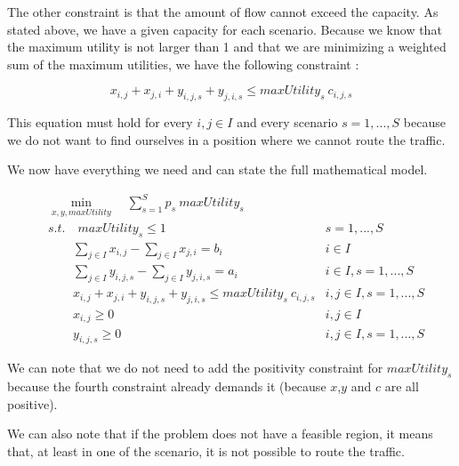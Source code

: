  The other constraint is that the amount of flow cannot exceed the capacity. As stated above, we have a given capacity for each scenario. Because we know that the maximum utility is not larger than 1 and that we are minimizing a weighted sum of the maximum utilities, we have the following constraint :
 
 $$x_{i,j}+x_{j,i}+y_{i,j,s}+y_{j,i,s} \leq maxUtility_s \: c_{i,j,s}$$
 
 This equation must hold for every $i,j \in I$ and every scenario $s=1,...,S$ because we do not want to find ourselves in a position where we cannot route the traffic.
 
 We now have everything we need and can state the full mathematical model.
 
 \begin{align*}
 &\min_{x,y,maxUtility} \quad \sum_{s=1}^S p_s \: maxUtility_s &\\
 &s.t. \quad maxUtility_s \leq 1 &s=1,...,S\\
 &\quad\quad \sum_{j\in I}x_{i,j} - \sum_{j\in I}x_{j,i} = b_i &i\in I\\
 &\quad\quad \sum_{j\in I}y_{i,j,s} - \sum_{j\in I}y_{j,i,s} = a_i &i\in I,s=1,...,S\\
 &\quad\quad x_{i,j}+x_{j,i}+y_{i,j,s}+y_{j,i,s} \leq maxUtility_s \: c_{i,j,s} &i,j\in I , s=1,...,S\\
 &\quad\quad x_{i,j} \geq 0 & i,j\in I\\
 &\quad \quad y_{i,j,s} \geq 0 & i,j\in I, s=1,...,S
 \end{align*}
 
 We can note that we do not need to add the positivity constraint for $maxUtility_s$ because the fourth constraint already demands it (because $x$,$y$ and $c$ are all positive).
 
 We can also note that if the problem does not have a feasible region, it means that, at least in one of the scenario, it is not possible to route the traffic.



 